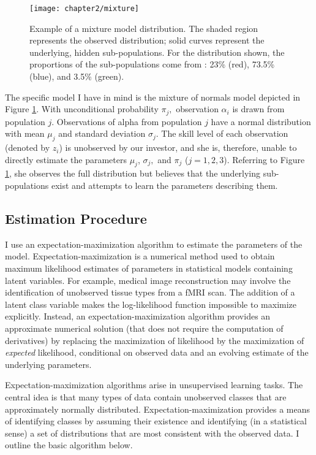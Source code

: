		\begin{figure}[t]
			\small
			\centering
			\texttt{[image: chapter2/mixture]}
			\captionsetup{skip=-20pt, font=footnotesize, justification=justified, width=\textwidth}
			\caption[Example of a mixture model distribution]{Example of a mixture model distribution. The shaded region represents the observed distribution; solid curves represent the underlying, hidden sub-populations. For the distribution shown, the proportions of the sub-populations come from \citet{Barras2010}: 23\% (red), 73.5\% (blue), and 3.5\% (green).}
			\label{fig:mixture}
		\end{figure}

		The specific model I have in mind is the mixture of normals model depicted in Figure \ref{fig:mixture}. With unconditional probability $\pi_j,$ observation $\alpha_i$ is drawn from population $j$. Observations of alpha from population $j$ have a normal distribution with mean $\mu_j$ and standard deviation $\sigma_j$. The skill level of each observation (denoted by $z_i$) is unobserved by our investor, and she is, therefore, unable to directly estimate the parameters $\mu_j$, $\sigma_j,$ and $\pi_j$ ($j=1,2,3$). Referring to Figure \ref{fig:mixture}, she observes the full distribution but believes that the underlying sub-populations exist and attempts to learn the parameters describing them.

	\subsection{Estimation Procedure}
		I use an expectation-maximization algorithm to estimate the parameters of the model. Expectation-maximization is a numerical method used to obtain maximum likelihood estimates of parameters in statistical models containing latent variables. For example, medical image reconstruction may involve the identification of unobserved tissue types from a fMRI scan.  The addition of a latent class variable makes the log-likelihood function impossible to maximize explicitly.  Instead, an expectation-maximization algorithm provides an approximate numerical solution (that does not require the computation of derivatives) by replacing the maximization of likelihood by the maximization of \textit{expected} likelihood, conditional on observed data and an evolving estimate of the underlying parameters.

		Expectation-maximization algorithms arise in unsupervised learning tasks.  The central idea is that many types of data contain unobserved classes that are approximately normally distributed.  Expectation-maximization provides a means of identifying classes by assuming their existence and identifying (in a statistical sense) a set of distributions that are most consistent with the observed data. I outline the basic algorithm below.

